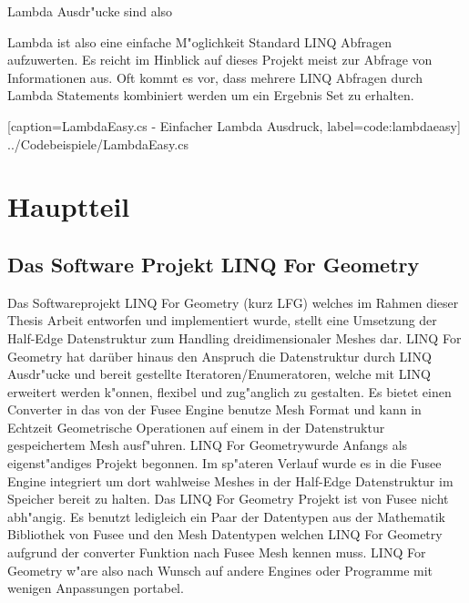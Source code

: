 \documentclass[pagesize, paper=a4, fontsize=12pt,titlepage=true, headings=small, headnosepline, abstractoff, liststotoc, nochapterprefix, plainheadsepline]{scrreprt}
\newcommand{\CSS}{C\texttt{\# }}
\newcommand{\LFG}{LINQ For Geometry}
\newcommand{\LFGS}{LINQ For Geometry }
\newcommand{\HES}{Half-Edge Datenstruktur }
\begin{document}
Lambda Ausdr"ucke sind also 

Lambda ist also eine einfache M"oglichkeit Standard LINQ Abfragen aufzuwerten. Es reicht im Hinblick auf dieses Projekt meist zur Abfrage von Informationen aus. Oft kommt es vor, dass mehrere LINQ Abfragen durch Lambda Statements kombiniert werden um ein Ergebnis Set zu erhalten. 

			[caption={LambdaEasy.cs - Einfacher Lambda Ausdruck}, label=code:lambdaeasy]
			{../Codebeispiele/LambdaEasy.cs}




\chapter {Hauptteil}
\section {Das Software Projekt LINQ For Geometry}
Das Softwareprojekt \LFGS (kurz LFG) welches im Rahmen dieser Thesis Arbeit entworfen und implementiert wurde, stellt eine Umsetzung der \HES zum Handling dreidimensionaler Meshes dar. \LFGS hat darüber hinaus den Anspruch die Datenstruktur durch LINQ Ausdr"ucke und bereit gestellte Iteratoren/Enumeratoren, welche mit LINQ erweitert werden k"onnen, flexibel und zug"anglich zu gestalten. Es bietet einen Converter in das von der Fusee Engine benutze Mesh Format und kann in Echtzeit Geometrische Operationen auf einem in der Datenstruktur gespeichertem Mesh ausf"uhren. \LFG wurde Anfangs als eigenst"andiges Projekt begonnen. Im sp"ateren Verlauf wurde es in die Fusee Engine integriert um dort wahlweise Meshes in der \HES im Speicher bereit zu halten. Das \LFGS Projekt ist von Fusee nicht abh"angig. Es benutzt ledigleich ein Paar der Datentypen aus der Mathematik Bibliothek von Fusee und den Mesh Datentypen welchen \LFGS aufgrund der converter Funktion nach Fusee Mesh kennen muss. \LFGS w"are also nach Wunsch auf andere Engines oder Programme mit wenigen Anpassungen portabel.
\end{document}
